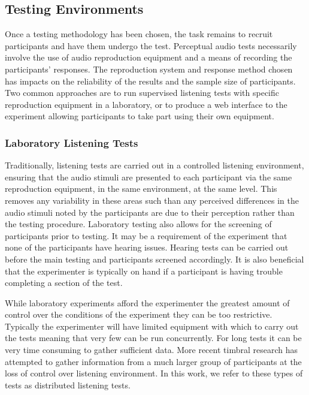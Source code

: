 	\subsection{Testing Environments}
	\label{sec:Timbre-ListeningTests-Environments}
		Once a testing methodology has been chosen, the task remains to recruit participants and have them
		undergo the test. Perceptual audio tests necessarily involve the use of audio reproduction equipment and a
		means of recording the participants' responses. The reproduction system and response method chosen has
		impacts on the reliability of the results and the sample size of participants. Two common approaches are to
		run supervised listening tests with specific reproduction equipment in a laboratory, or to produce a web
		interface to the experiment allowing participants to take part using their own equipment.

		\subsubsection*{Laboratory Listening Tests}
			Traditionally, listening tests are carried out in a controlled listening environment, ensuring that
			the audio stimuli are presented to each participant via the same reproduction equipment, in the
			same environment, at the same level. This removes any variability in these areas such than any
			perceived differences in the audio stimuli noted by the participants are due to their perception
			rather than the testing procedure. Laboratory testing also allows for the screening of participants
			prior to testing. It may be a requirement of the experiment that none of the participants have
			hearing issues. Hearing tests can be carried out before the main testing and participants screened
			accordingly. It is also beneficial that the experimenter is typically on hand if a participant is
			having trouble completing a section of the test.

			While laboratory experiments afford the experimenter the greatest amount of control over the
			conditions of the experiment they can be too restrictive. Typically the experimenter will have
			limited equipment with which to carry out the tests meaning that very few can be run concurrently.
			For long tests it can be very time consuming to gather sufficient data. More recent timbral
			research has attempted to gather information from a much larger group of participants at the loss
			of control over listening environment. In this work, we refer to these types of tests as
			distributed listening tests.

